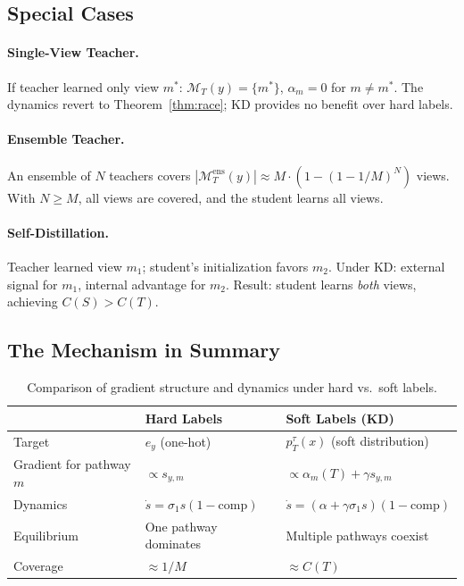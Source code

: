 \documentclass{article}
\newcommand{\cM}{\mathcal{M}}
\begin{document}
\subsection{Special Cases}

\paragraph{Single-View Teacher.} If teacher learned only view $m^*$: $\cM_T(y) = \{m^*\}$, $\alpha_m = 0$ for $m \neq m^*$. The dynamics revert to Theorem~\ref{thm:race}; KD provides no benefit over hard labels.

\paragraph{Ensemble Teacher.} An ensemble of $N$ teachers covers $|\cM_T^{\text{ens}}(y)| \approx M \cdot (1 - (1-1/M)^N)$ views. With $N \geq M$, all views are covered, and the student learns all views.

\paragraph{Self-Distillation.} Teacher learned view $m_1$; student's initialization favors $m_2$. Under KD: external signal for $m_1$, internal advantage for $m_2$. Result: student learns \emph{both} views, achieving $C(S) > C(T)$.

\subsection{The Mechanism in Summary}

\begin{table}[h]
\centering
\caption{Comparison of gradient structure and dynamics under hard vs.\ soft labels.}
\label{tab:comparison}
\begin{tabular}{@{}lll@{}}
\toprule
& \textbf{Hard Labels} & \textbf{Soft Labels (KD)} \\
\midrule
Target & $e_y$ (one-hot) & $p_T^\tau(x)$ (soft distribution) \\
Gradient for pathway $m$ & $\propto s_{y,m}$ & $\propto \alpha_m(T) + \gamma s_{y,m}$ \\
Dynamics & $\dot{s} = \sigma_1 s (1 - \text{comp})$ & $\dot{s} = (\alpha + \gamma \sigma_1 s)(1 - \text{comp})$ \\
Equilibrium & One pathway dominates & Multiple pathways coexist \\
Coverage & $\approx 1/M$ & $\approx C(T)$ \\
\bottomrule
\end{tabular}
\end{table}
\end{document}
